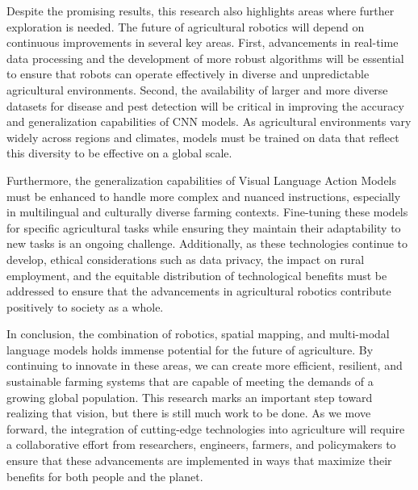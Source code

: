 Despite the promising results, this research also highlights areas where further exploration is needed. The future of agricultural robotics will depend on continuous improvements in several key areas. First, advancements in real-time data processing and the development of more robust algorithms will be essential to ensure that robots can operate effectively in diverse and unpredictable agricultural environments. Second, the availability of larger and more diverse datasets for disease and pest detection will be critical in improving the accuracy and generalization capabilities of CNN models.\cite{cieslak2024generatingdiverseagriculturaldata} As agricultural environments vary widely across regions and climates, models must be trained on data that reflect this diversity to be effective on a global scale.

Furthermore, the generalization capabilities of Visual Language Action Models must be enhanced to handle more complex and nuanced instructions, especially in multilingual and culturally diverse farming contexts. Fine-tuning these models for specific agricultural tasks while ensuring they maintain their adaptability to new tasks is an ongoing challenge. Additionally, as these technologies continue to develop, ethical considerations such as data privacy, the impact on rural employment, and the equitable distribution of technological benefits must be addressed to ensure that the advancements in agricultural robotics contribute positively to society as a whole.

In conclusion, the combination of robotics, spatial mapping, and multi-modal language models holds immense potential for the future of agriculture. By continuing to innovate in these areas, we can create more efficient, resilient, and sustainable farming systems that are capable of meeting the demands of a growing global population. This research marks an important step toward realizing that vision, but there is still much work to be done. As we move forward, the integration of cutting-edge technologies into agriculture will require a collaborative effort from researchers, engineers, farmers, and policymakers to ensure that these advancements are implemented in ways that maximize their benefits for both people and the planet.

